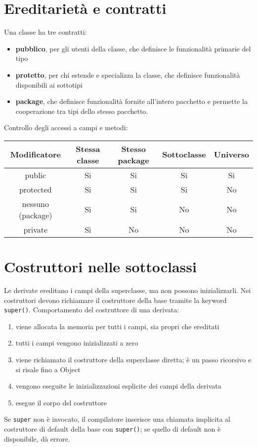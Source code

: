 \section{Ereditarietà e contratti} %
Una classe ha tre contratti:
\begin{itemize}
\item \textbf{pubblico}, per gli utenti della classe, che definisce le funzionalità primarie del tipo
\item \textbf{protetto}, per chi estende e specializza la classe, che definisce funzionalità disponibili ai sottotipi
\item \textbf{package}, che definisce funzionalità fornite all'intero pacchetto e permette la cooperazione tra tipi dello stesso pacchetto.
\end{itemize}
Controllo degli accessi a campi e metodi:
\begin{table}[h]
\begin{tabular}{|c|c|c|c|c|}
\hline
\textbf{Modificatore} & \textbf{Stessa classe} & \textbf{Stesso package} & \textbf{Sottoclasse} & \textbf{Universo} \\
\hline
public & Si & Si & Si & Si \\
\hline
protected & Si & Si & Si & No \\
\hline
nessuno (package) & Si & Si & No & No \\
\hline
private & Si & No & No & No \\
\hline
\end{tabular}
\end{table}

\section{Costruttori nelle sottoclassi} %
Le derivate ereditano i campi della superclasse, ma non possono inizializzarli. Nei costruttori devono richiamare il costruttore della base tramite la keyword \texttt{super()}.
Comportamento del costruttore di una derivata:
\begin{enumerate}
\item viene allocata la memoria per tutti i campi, sia propri che ereditati
\item tutti i campi vengono inizializzati a zero
\item viene richiamato il costruttore della superclasse diretta; è un passo ricorsivo e si risale fino a Object
\item vengono eseguite le inizializzazioni esplicite dei campi della derivata
\item esegue il corpo del costruttore
\end{enumerate}
Se \texttt{super} non è invocato, il compilatore inserisce una chiamata implicita al costruttore di default della base con \texttt{super()}; se quello di default non è disponibile, dà errore.



